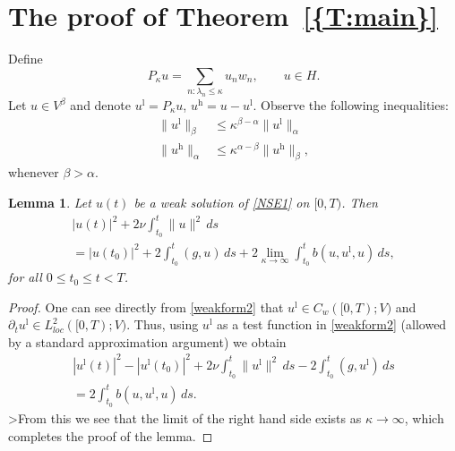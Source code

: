 \documentclass[12pt]{amsart}
\theoremstyle{plain}
\newtheorem{lemma}[THEOREM]{Lemma}
\theoremstyle{definition}
\theoremstyle{remark}
\begin{document}
\section{The proof of {Theorem~\ref{{T:main}}}}

Define
\begin{equation}
P_{\kappa} u= \sum_{n:\lambda_n \leq \kappa} u_n w_n, \qquad u \in H.
\end{equation}
Let $u\in V^{\beta}$ and denote ${{u^\mathrm{l}}}=P_{\kappa} u$, ${{u^\mathrm{h}}}=u-{{u^\mathrm{l}}}$.
Observe the following inequalities:
\begin{equation}\label{ba}
\begin{aligned}
\|{{u^\mathrm{l}}}\|_{\beta} &\leq {\kappa}^{{\beta} - {\alpha}} \|{{u^\mathrm{l}}}\|_{\alpha}  \\
\|{{u^\mathrm{h}}}\|_{\alpha} &\leq {\kappa}^{{\alpha} - {\beta}} \|{{u^\mathrm{h}}}\|_{\beta},
\end{aligned}
\end{equation}
whenever ${\beta} > {\alpha}$.

\begin{lemma} \label{tr}
Let $u(t)$ be a weak solution of \eqref{NSE1} on $[0,T)$. Then
\begin{multline}
    |u(t)|^2 +  2\nu\int_{t_0}^t \|u\|^2 \, ds \\= |u(t_0)|^2 + 2\int_{t_0}^t (g, u) \, ds +
      2\lim_{{\kappa} \to \infty} \int_{t_0}^t b(u,{{u^\mathrm{l}}},u) \, ds,
\end{multline}
for all $0 \leq t_0 \leq t < T$.
\end{lemma}
\begin{proof}
One can see directly from \eqref{weakform2} that ${{u^\mathrm{l}}} \in
C_w([0,T); V)$ and ${\partial}_t {{u^\mathrm{l}}} \in L^2_{loc}([0,T);V)$. Thus, using
${{u^\mathrm{l}}}$ as a test function in \eqref{weakform2} (allowed by a standard
approximation argument)  we obtain
\begin{multline}
    |{{u^\mathrm{l}}}(t)|^2 - |{{u^\mathrm{l}}}(t_0)|^2 + 2\nu\int_{t_0}^t \|{{u^\mathrm{l}}}\|^2 \, ds
    - 2\int_{t_0}^t (g, {{u^\mathrm{l}}}) \, ds \\ =2\int_{t_0}^t b(u,{{u^\mathrm{l}}},u) \, ds.
\end{multline}
>From this we see that the limit of the right hand side exists as ${\kappa}
\to \infty$, which completes the proof of the lemma.
\end{proof}
\end{document}
